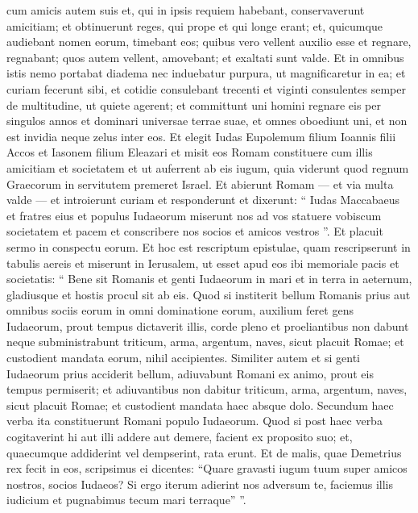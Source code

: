 \begin{biblechapter}
\begin{biblechapter}
\begin{biblechapter}
\begin{biblechapter}
\begin{biblechapter}
\begin{biblechapter}
\begin{biblechapter}
\begin{biblechapter}
\verse cum amicis autem suis et, qui in ipsis requiem habebant, conservaverunt amicitiam; et obtinuerunt reges, qui prope et qui longe erant; et, quicumque audiebant nomen eorum, timebant eos; 
 \verse quibus vero vellent auxilio esse et regnare, regnabant; quos autem vellent, amovebant; et exaltati sunt valde. 
\verse Et in omnibus istis nemo portabat diadema nec induebatur purpura, ut magnificaretur in ea; 
\verse et curiam fecerunt sibi, et cotidie consulebant trecenti et viginti consulentes semper de multitudine, ut quiete agerent; 
\verse et committunt uni homini regnare eis per singulos annos et dominari universae terrae suae, et omnes oboediunt uni, et non est invidia neque zelus inter eos.
 \verse Et elegit Iudas Eupolemum filium Ioannis filii Accos et Iasonem filium Eleazari et misit eos Romam constituere cum illis amicitiam et societatem 
\verse et ut auferrent ab eis iugum, quia viderunt quod regnum Graecorum in servitutem premeret Israel. 
\verse Et abierunt Romam — et via multa valde — et introierunt curiam et responderunt et dixerunt: 
\verse “ Iudas Maccabaeus et fratres eius et populus Iudaeorum miserunt nos ad vos statuere vobiscum societatem et pacem et conscribere nos socios et amicos vestros ”. 
\verse Et placuit sermo in conspectu eorum. 
\verse Et hoc est rescriptum epistulae, quam rescripserunt in tabulis aereis et miserunt in Ierusalem, ut esset apud eos ibi memoriale pacis et societatis: 
\verse “ Bene sit Romanis et genti Iudaeorum in mari et in terra in aeternum, gladiusque et hostis procul sit ab eis. 
\verse Quod si institerit bellum Romanis prius aut omnibus sociis eorum in omni dominatione eorum, 
\verse auxilium feret gens Iudaeorum, prout tempus dictaverit illis, corde pleno 
\verse et proeliantibus non dabunt neque subministrabunt triticum, arma, argentum, naves, sicut placuit Romae; et custodient mandata eorum, nihil accipientes. 
\verse Similiter autem et si genti Iudaeorum prius acciderit bellum, adiuvabunt Romani ex animo, prout eis tempus permiserit; 
\verse et adiuvantibus non dabitur triticum, arma, argentum, naves, sicut placuit Romae; et custodient mandata haec absque dolo. 
\verse Secundum haec verba ita constituerunt Romani populo Iudaeorum. 
\verse Quod si post haec verba cogitaverint hi aut illi addere aut demere, facient ex proposito suo; et, quaecumque addiderint vel dempserint, rata erunt. 
\verse Et de malis, quae Demetrius rex fecit in eos, scripsimus ei dicentes: “Quare gravasti iugum tuum super amicos nostros, socios Iudaeos? 
 \verse Si ergo iterum adierint nos adversum te, faciemus illis iudicium et pugnabimus tecum mari terraque” ”.
 

\end{biblechapter}
\end{biblechapter}
\end{biblechapter}
\end{biblechapter}
\end{biblechapter}
\end{biblechapter}
\end{biblechapter}
\end{biblechapter}
